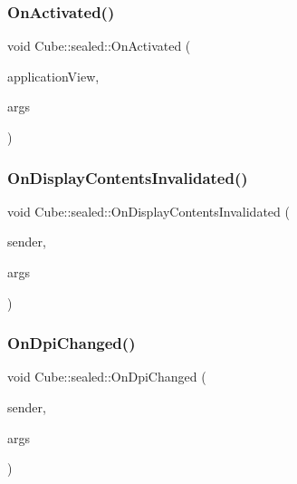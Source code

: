 \mbox{\label{class_cube_1_1sealed_a7bfa5f48c7415394b76a4152b5fb6abf}} 
\subsubsection{\texorpdfstring{On\+Activated()}{OnActivated()}}
{\footnotesize\ttfamily void Cube\+::sealed\+::\+On\+Activated (\begin{DoxyParamCaption}\item[{Windows\+::\+Application\+Model\+::\+Core\+::\+Core\+Application\+View$^\wedge$}]{application\+View,  }\item[{Windows\+::\+Application\+Model\+::\+Activation\+::\+I\+Activated\+Event\+Args$^\wedge$}]{args }\end{DoxyParamCaption})\hspace{0.3cm}{\ttfamily [protected]}}

\mbox{\label{class_cube_1_1sealed_a46527bc6fafc0e7ca68c97d3cc2a51d4}} 
\subsubsection{\texorpdfstring{On\+Display\+Contents\+Invalidated()}{OnDisplayContentsInvalidated()}}
{\footnotesize\ttfamily void Cube\+::sealed\+::\+On\+Display\+Contents\+Invalidated (\begin{DoxyParamCaption}\item[{Windows\+::\+Graphics\+::\+Display\+::\+Display\+Information$^\wedge$}]{sender,  }\item[{Platform\+::\+Object$^\wedge$}]{args }\end{DoxyParamCaption})\hspace{0.3cm}{\ttfamily [protected]}}

\mbox{\label{class_cube_1_1sealed_a4621df1969e0c25abcaf42b9b09c1294}} 
\subsubsection{\texorpdfstring{On\+Dpi\+Changed()}{OnDpiChanged()}}
{\footnotesize\ttfamily void Cube\+::sealed\+::\+On\+Dpi\+Changed (\begin{DoxyParamCaption}\item[{Windows\+::\+Graphics\+::\+Display\+::\+Display\+Information$^\wedge$}]{sender,  }\item[{Platform\+::\+Object$^\wedge$}]{args }\end{DoxyParamCaption})\hspace{0.3cm}{\ttfamily [protected]}}

